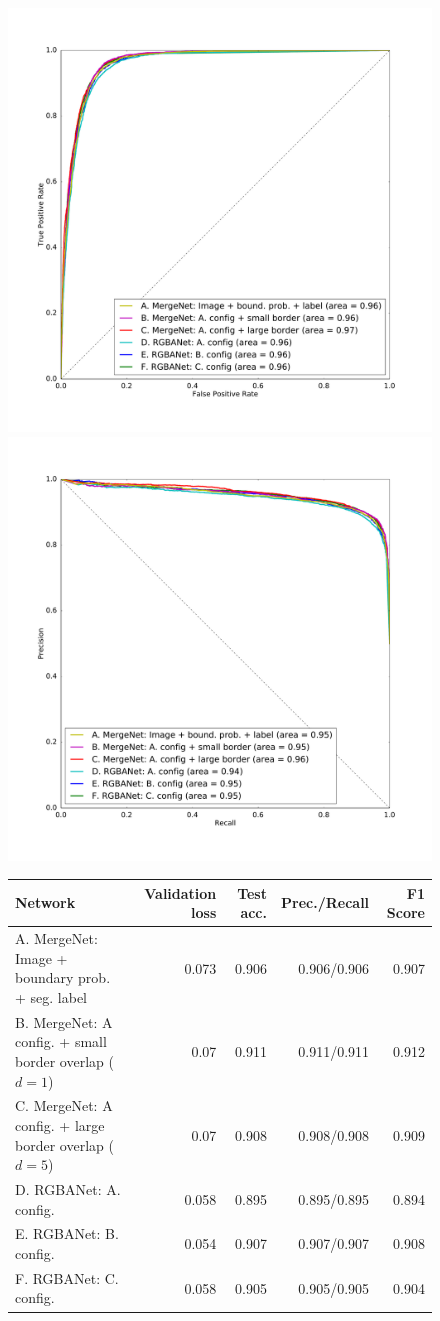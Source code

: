 \begin{figure}[ht]
\begin{floatrow}

\includegraphics[width=.5\textwidth]{gfx/roc_plot.pdf}
\includegraphics[width=.5\textwidth]{gfx/pr_plot.pdf}
\end{floatrow}

\begin{tabular}{l rrrr}
\toprule
Network & Validation loss & Test acc. & Prec./Recall & \hspace{0.1cm} F1 Score \\
\midrule
A. MergeNet: Image + boundary prob. + seg. label & 0.073 & 0.906 & 0.906/0.906 & 0.907 \\
B. MergeNet: A config. + small border overlap ($d=1$) & 0.07 & 0.911 & 0.911/0.911 & 0.912 \\
C. MergeNet: A config. + large border overlap ($d=5$) & 0.07 & 0.908 & 0.908/0.908 & 0.909 \\
D. RGBANet: A. config. & 0.058 & 0.895 & 0.895/0.895 & 0.894 \\
E. RGBANet: B. config. & 0.054 & 0.907 & 0.907/0.907 & 0.908 \\
F. RGBANet: C. config. & 0.058 & 0.905 & 0.905/0.905 & 0.904\\
\bottomrule
\end{tabular}


\end{figure}
